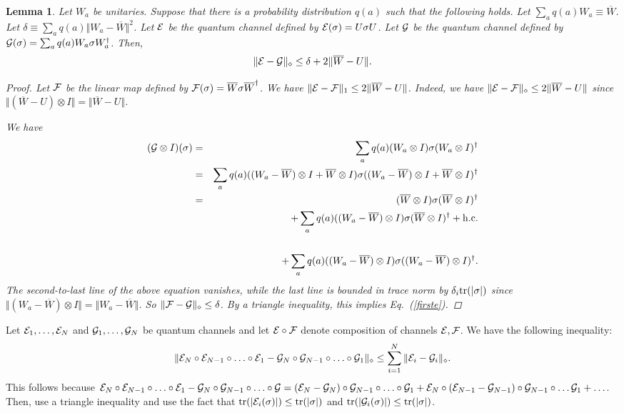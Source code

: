 \documentclass[aps,prl,amsmath,amssymb,amsfonts,superscriptaddress,floatfix]{revtex4}
\newtheorem{lemma}{Lemma}
\newcommand{\tr}{{\rm tr}}
\newcommand{\be}{\begin{equation}}
\newcommand{\ee}{\end{equation}}
\begin{document}
\begin{lemma}
\label{onel}
Let $W_a$ be unitaries.
Suppose that there is a probability distribution $q(a)$ such that the following holds.
Let
$\sum_a q(a) W_a \equiv \overline W$.
Let
$\delta \equiv \sum_a q(a) \Vert W_a-\overline W\Vert^2$.
Let ${\cal E}$ be the quantum channel defined by ${\cal E}(\sigma)=U \sigma U$.
Let ${\cal G}$  be the quantum channel defined by ${\cal G}(\sigma)=\sum_a q(a) W_{a} \sigma W_{a}^\dagger$.
Then, 
\be
\label{firste}
\Vert {\cal E}-{\cal G} \Vert_\diamond \leq \delta+2\Vert \overline W-U\Vert.
\ee

\begin{proof}
Let ${\cal F}$ be the linear map defined by ${\cal F}(\sigma)=\overline W \sigma \overline W^\dagger$.
We have 
$\Vert {\cal E}-{\cal F} \Vert_1\leq 2 \Vert \overline W - U \Vert$.
Indeed, we have
$\Vert {\cal E}-{\cal F} \Vert_\diamond\leq 2 \Vert \overline W- U\Vert $ since
$\Vert (\overline W - U) \otimes I \Vert =\Vert \overline W- U \Vert $.


We have
\begin{eqnarray}
({\cal G}\otimes I)(\sigma)&=&\sum_a q(a) (W_{a}\otimes I) \sigma (W_{a}\otimes I)^\dagger \\ \nonumber
&=&
\sum_a q(a) ((W_{a}-\overline W)\otimes I+\overline W\otimes I) \sigma ((W_{a}-\overline W)\otimes I+\overline W\otimes I)^\dagger \\ \nonumber
&=&(\overline W\otimes I) \sigma (\overline W\otimes I)^\dagger \\ \nonumber
&&+\sum_a q(a) ((W_{a}-\overline W)\otimes I)\sigma (\overline W\otimes I)^\dagger+{\rm h.c.}  \\ \nonumber \\
&&+\sum_a q(a) ((W_{a}-\overline W)\otimes I)\sigma ((W_{a}-\overline W)\otimes I)^\dagger.
\end{eqnarray}
The second-to-last line of the above equation vanishes, while the last line is bounded in trace norm by $\delta_i \tr( |\sigma|)$ since $\Vert (W_{a}-\overline W)\otimes I \Vert=\Vert W_{a}-\overline W \Vert$.
So
$\Vert {\cal F}-{\cal G}\Vert_\diamond \leq \delta$.  By a triangle inequality, this implies
Eq.~(\ref{firste}).
\end{proof}
\end{lemma}

Let ${\cal E}_1,\ldots,{\cal E}_N$ and ${\cal G}_1,\ldots,{\cal G}_N$ be quantum channels and let
${\cal E}\circ {\cal F}$ denote composition of channels ${\cal E},{\cal F}$.
We have the following inequality:
\be
\label{compineq}
\Vert {\cal E}_N\circ {\cal E}_{N-1} \circ \ldots \circ {\cal E}_1 - {\cal G}_N \circ {\cal G}_{N-1} \circ \ldots \circ {\cal G}_1\Vert_\diamond \leq 
\sum_{i=1}^N \Vert {\cal E}_i-{\cal G}_i \Vert_{\diamond}.
\ee
This follows because ${\cal E}_N\circ {\cal E}_{N-1} \circ \ldots \circ {\cal E}_1 - {\cal G}_N \circ {\cal G}_{N-1} \circ \ldots \circ {\cal G}=({\cal E}_N-{\cal G}_N)\circ {\cal G}_{N-1} \circ \ldots \circ {\cal G}_1+{\cal E}_N \circ ({\cal E}_{N-1}-{\cal G}_{N-1}) \circ {\cal G}_{N-1} \circ \ldots {\cal G}_1+\ldots$.
Then, use a triangle inequality and use the fact that $\tr(|{\cal E}_{i}(\sigma)|) \leq \tr(|\sigma|)$ and $\tr(|{\cal G}_{i}(\sigma)|) \leq \tr(|\sigma|)$.
\end{document}
